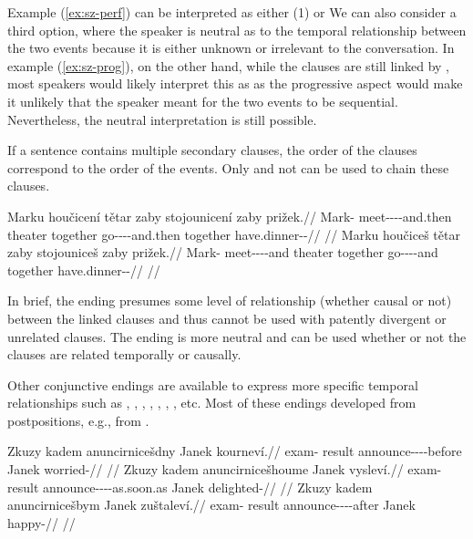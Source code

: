 Example (\ref{ex:sz-perf}) can be interpreted as either (1)  or  We can also consider a
third option, where the speaker is neutral as to the temporal relationship
between the two events because it is either unknown or irrelevant to the
conversation. In example (\ref{ex:sz-prog}), on the other hand, while the
clauses are still linked by , most speakers would likely interpret
this as 
as the progressive aspect would make it unlikely that the speaker meant for the
two events to be sequential. Nevertheless, the neutral interpretation
 is still possible.

If a sentence contains multiple secondary clauses, the order of the clauses
correspond to the order of the events. Only  and not  can be
used to chain these clauses.

\pex
\a\begingl
  \gla \ljudge{*}Marku houčicení tětar zaby stojounicení zaby prižek.//
  \glb Mark-\Ins{} meet-\Av{}-\Pf{}-\Cnj{}-and.then theater together
        go-\Lv{}-\Pf{}-\Cnj{}-and.then together have.dinner-\Av{}-\Pf{}//
  \glft {}//
\endgl
\a\begingl
\gla Marku houčiceš tětar zaby stojouniceš zaby prižek.//
\glb Mark-\Ins{} meet-\Av{}-\Pf{}-\Cnj{}-and theater together
      go-\Lv{}-\Pf{}-\Cnj{}-and together have.dinner-\Av{}-\Pf{}//
\glft {}//
\endgl
\xe

In brief, the ending  presumes some level of relationship (whether
causal or not) between the linked clauses and thus cannot be used with patently
divergent or unrelated clauses. The ending  is more neutral and can be
used whether or not the clauses are related temporally or causally.

Other conjunctive endings are available to express more specific temporal
relationships such as , ,
, , , , , etc. Most of these endings
developed from postpositions, e.g.,  from .

\pex
\a
\begingl
  \gla Zkuzy kadem anuncirnicešdny Janek kourneví.//
  \glb exam-\Gen{} result announce-\Pv{}-\Pf{}-\Cnj{}-before Janek worried-\Cont{}//
  \glft {}//
\endgl
\a
\begingl
  \gla Zkuzy kadem anuncirnicešhoume Janek vysleví.//
  \glb exam-\Gen{} result announce-\Pv{}-\Pf{}-\Cnj{}-as.soon.as Janek delighted-\Cont{}//
  \glft {}//
\endgl
\a
\begingl
  \gla Zkuzy kadem anuncirnicešbym Janek zuštaleví.//
  \glb exam-\Gen{} result announce-\Pv{}-\Pf{}-\Cnj{}-after Janek happy-\Cont{}//
  \glft {}//
\endgl
{}
\xe

